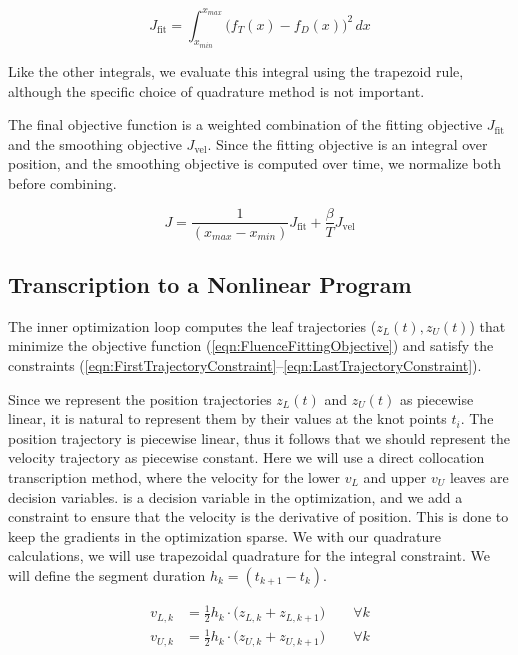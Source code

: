 \begin{equation}
  J_\text{fit} = \int_{x_{min}}^{x_{max}} \! \big( f_T(x) - f_D(x) \big)^2 \,dx
\end{equation}

Like the other integrals, we evaluate this integral using the trapezoid rule,
although the specific choice of quadrature method is not important.

The final objective function is a weighted combination of the
fitting objective $J_\text{fit}$ and the smoothing objective $J_\text{vel}$.
Since the fitting objective is an integral over position, and the smoothing objective
is computed over time, we normalize both before combining.

\begin{equation}
  J = \frac{1}{(x_{max} - x_{min})} J_\text{fit}
    + \frac{\beta}{T} J_\text{vel}
\label{eqn:FluenceFittingObjective}
\end{equation}

\subsection{Transcription to a Nonlinear Program}

The inner optimization loop computes the leaf trajectories ($z_L(t), z_U(t)$)
that minimize the objective function (\ref{eqn:FluenceFittingObjective})
and satisfy the constraints (\ref{eqn:FirstTrajectoryConstraint}--\ref{eqn:LastTrajectoryConstraint}).

Since we represent the position trajectories $z_L(t)$ and $z_U(t)$ as piecewise linear,
it is natural to represent them by their values at the knot points $t_i$.
The position trajectory is piecewise linear, thus it follows that we should represent the
velocity trajectory as piecewise constant.
Here we will use a direct collocation transcription method, where the velocity for the
lower $v_L$ and upper $v_U$ leaves are decision variables.
is a decision variable in the optimization,
and we add a constraint to ensure that the velocity is the derivative of position.
This is done to keep the gradients in the optimization sparse. 
We with our quadrature calculations, we will use trapezoidal quadrature for the integral constraint.
We will define the segment duration $h_k = (t_{k+1} - t_k)$.

\begin{align}
  v_{L,k} & = \tfrac{1}{2} h_k \cdot  \big( z_{L, k} + z_{L, k+1} \big)
  \quad \quad \forall k\\
  v_{U,k} & = \tfrac{1}{2} h_k \cdot  \big( z_{U, k} + z_{U, k+1} \big)
  \quad \quad \forall k\\
\end{align}

